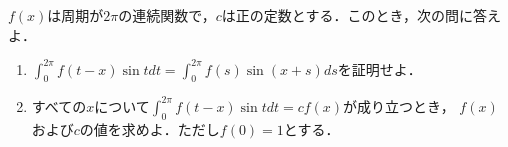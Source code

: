\documentclass[../../main.tex]{subfiles}
\begin{document}
$f(x)$は周期が$2\pi$の連続関数で，$c$は正の定数とする．このとき，次の問に答えよ．
\begin{enumerate}
  \item $\displaystyle\int_0^{2\pi}f(t-x)\sin tdt=\int_0^{2\pi}f(s)\sin(x+s)ds$を証明せよ．
  \item すべての$x$について$\displaystyle\int_0^{2\pi}f(t-x)\sin tdt=cf(x)$が成り立つとき，
    $f(x)$および$c$の値を求めよ．ただし$f(0)=1$とする．
\end{enumerate}
\end{document}
